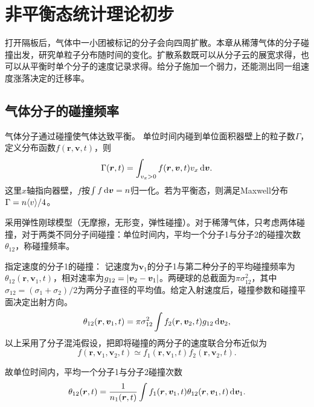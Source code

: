 \chapter{非平衡态统计理论初步}

打开隔板后，气体中一小团被标记的分子会向四周扩散。本章从稀薄气体的分子碰撞出发，研究单粒子分布随时间的变化。扩散系数既可以从分子云的展宽求得，也可以从平衡时单个分子的速度记录求得。给分子施加一个弱力，还能测出同一组速度涨落决定的迁移率。

\section{气体分子的碰撞频率}

气体分子通过碰撞使气体达致平衡。
单位时间内碰到单位面积器壁上的粒子数$\Gamma$，定义分布函数$f(\bm r,\bm v,t)$，则
\begin{equation}
	\label{eq:sm-wall-particle-flux}
	\Gamma(\bm r,t) = \int_{v_x>0}f(\bm r,\bm v,t)v_x\mathop{}\!\mathrm{d}\bm v.
\end{equation}
这里$x$轴指向器壁，$f$按$\textstyle \int f\mathop{}\!\mathrm{d}\bm v = n$归一化。若为平衡态，则满足Maxwell分布$\Gamma = n\langle v\rangle/4$。

采用弹性刚球模型（无摩擦，无形变，弹性碰撞）。对于稀薄气体，只考虑两体碰撞，对于两类不同分子间碰撞：单位时间内，平均一个分子1与分子2的碰撞次数$\theta_{12}$，称碰撞频率。

指定速度的分子1的碰撞：
记速度为$\bm v_1$的分子1与第二种分子的平均碰撞频率为$\theta_{12}(\bm r,\bm v_1,t)$，相对速率为$g_{12} = \lvert\bm v_2 - \bm v_1\rvert$。两硬球的总截面为$\pi\sigma^2_{12}$，其中$\sigma_{12} = (\sigma_1 + \sigma_2)/2$为两分子直径的平均值。给定入射速度后，碰撞参数和碰撞平面决定出射方向。
\begin{align}
	\theta_{12}(\bm r,\bm v_1,t) = \pi\sigma_{12}^2\int f_2(\bm r,\bm v_2,t)g_{12}\mathop{}\!\mathrm{d}\bm v_2,
\end{align}
以上采用了分子混沌假设，把即将碰撞的两分子的速度联合分布近似为
\begin{equation}
	\label{eq:sm-molecular-chaos}
	f(\bm r,\bm v_1,\bm v_2,t) \simeq f_1(\bm r,\bm v_1,t)f_2(\bm r,\bm v_2,t).
\end{equation}

故单位时间内，平均一个分子1与分子2碰撞次数
\begin{align}
	\theta_{12}(\bm r,t) = \frac1{n_1(\bm r,t)}\int f_1(\bm r,\bm v_1,t)\theta_{12}(\bm r,\bm v_1,t)\mathop{}\!\mathrm{d}\bm v_1.
\end{align}
